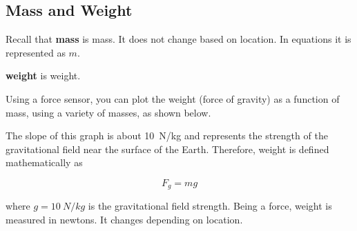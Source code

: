 \documentclass[dvipsnames]{article}
\begin{document}
\subsection{Mass and Weight}

Recall that \textbf{\gls{mass}} is \glsdesc{mass}. It does not change based on location. In equations it is represented as $m$.

\textbf{\Gls{weight}} is \glsdesc{weight}. 

Using a force sensor, you can plot the weight (force of gravity) as a function of mass, using a variety of masses, as shown below.

\begin{center}
\begin{minipage}[c][5cm][c]{0.3\textwidth}
\centering
{}
\end{minipage}%
\begin{minipage}[c][5cm][c]{0.45\textwidth}
\end{minipage}
\end{center}

The slope of this graph is about \SI{10}{N/kg} and represents the strength of the gravitational field near the surface of the Earth. Therefore, weight is defined mathematically as

\begin{equation}
    F_g = mg
\end{equation}

where $g = \SI{10}{N/kg}$ is the gravitational field strength. Being a force, weight is measured in newtons. It changes depending on location. 
\end{document}
